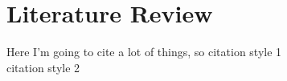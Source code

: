\section{Literature Review}

Here I'm going to cite a lot of things, so 
\Textcite{fayazUnderwaterObjectDetection2022} citation style 1\\
\parencite{fayazUnderwaterObjectDetection2022} citation style 2